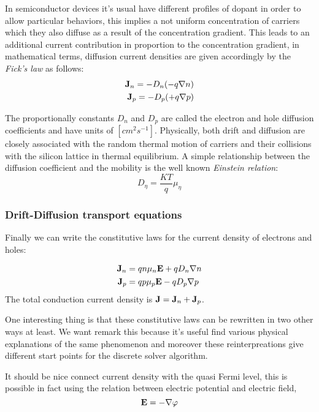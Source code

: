 In semiconductor devices it's usual have different profiles of dopant in order to allow particular behaviors, this implies a not uniform concentration of carriers which they also diffuse as a result of the concentration gradient. This leads to an additional current contribution in proportion to the concentration gradient, in mathematical terms, diffusion current densities are given accordingly by the \textit{Fick's law} as follows:
\begin{align}
\mathbf{J}_n = -D_n(-q\nabla n) \\
\mathbf{J}_p = -D_p(+q\nabla p)
\end{align}

The proportionally constants $D_n$ and $D_p$ are called the electron and hole diffusion coefficients and have units of $[cm^2s^{-1}]$. Physically, both drift and diffusion are closely associated with the random thermal motion of carriers and their collisions with the silicon lattice in thermal equilibrium. A simple relationship between the diffusion coefficient and the mobility is the well known \textit{Einstein relation}:
\begin{equation}
D_\eta = \dfrac{KT}{q}\mu_\eta
\end{equation}

\subsubsection{Drift-Diffusion transport equations}
\label{subsub:driftdiffusion transport}

Finally we can write the constitutive laws for the current density of electrons and holes:

\begin{align}
\mathbf{J}_n &= qn\mu_n\mathbf{E} + qD_n\nabla n  \label{eq: drift diff electron}\\ 
\mathbf{J}_p &= qp\mu_p\mathbf{E} - qD_p \nabla p \label{eq: drift diff hole}
\end{align}
The total conduction current density is $\mathbf{J}=\mathbf{J}_n+\mathbf{J}_p$.

One interesting thing is that these constitutive laws can be rewritten in two other ways at least. We want remark this because it's useful find various physical explanations of the same phenomenon and moreover these reinterpreations  give different start points for the discrete solver algorithm.

It should be nice connect current density with the quasi Fermi level, this is possible in fact using the relation between electric potential and electric field,
\begin{equation}
\mathbf{E}  = -\nabla \varphi
\end{equation}

